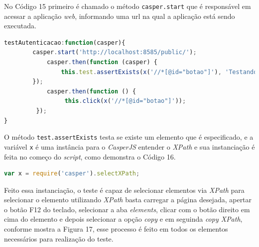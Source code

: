 \par No Código 15 primeiro é chamado o método \texttt{casper.start} que é responsável em acessar a aplicação \textit{web}, informando uma url na qual a aplicação está sendo executada.



\begin{lstlisting}[language=JavaScript, caption={[Acessar aplicação utilizando método casper.start.]{Acessar aplicação utilizando método casper.start.  \textbf{Fonte:} Elaborado pelos autores.}}]
testAutenticacao:function(casper){
        casper.start('http://localhost:8585/public/');
            casper.then(function (casper) {
                this.test.assertExists(x('//*[@id="botao"]'), 'Testando se existe o botão de login');
        });
            casper.then(function () {
                 this.click(x('//*[@id="botao"]'));
         });
}
\end{lstlisting}

\par O método \texttt{test.assertExists} testa se existe um elemento que é especificado, e a variável \texttt{x} é uma instância para o \textit{CasperJS} entender o \textit{XPath} e sua instanciação é feita no começo do \textit{script}, como demonstra o Código 16.


\begin{lstlisting}[language=JavaScript, caption={[Atribuição para o seletor de XPath.]{Atribuição para o seletor de XPath.  \textbf{Fonte:} Elaborado pelos autores.}}]
var x = require('casper').selectXPath;

\end{lstlisting}


\par Feito essa instanciação, o teste é capaz de selecionar elementos via \textit{XPath} para selecionar o elemento utilizando \textit{XPath} basta carregar a página desejada, apertar o botão F12 do teclado, selecionar a aba \textit{elements}, clicar com o botão direito em cima do elemento e depois selecionar a opção \textit{copy} e em seguinda \textit{copy XPath}, conforme mostra a Figura 17, esse processo é feito em todos os elementos necessários para realização do teste.


\newpage

